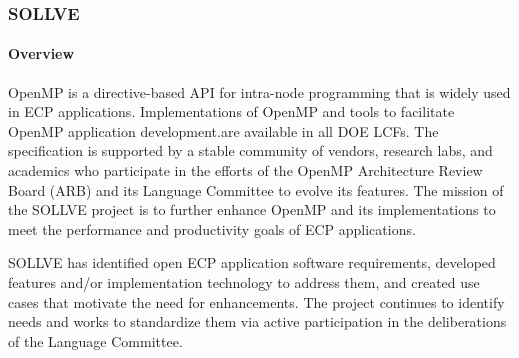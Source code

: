 \subsubsection{SOLLVE} 



\paragraph{Overview}
OpenMP is a directive-based API for intra-node programming that is widely used  in ECP applications. Implementations of OpenMP and  tools to facilitate OpenMP application development.are available in all DOE LCFs.  
The specification is supported by a stable community of vendors, research labs, and academics who
participate in the efforts of the  OpenMP Architecture Review Board (ARB) and its Language Committee to evolve its features.
The mission of the SOLLVE project is to further enhance  OpenMP and its implementations to meet the performance and productivity goals of ECP applications. 

SOLLVE has identified open ECP application software requirements, developed features and/or implementation technology to address them, and created use cases that motivate the need for enhancements. 
 The project continues to identify needs and works to standardize them via 
active participation in the deliberations of the Language Committee.  

